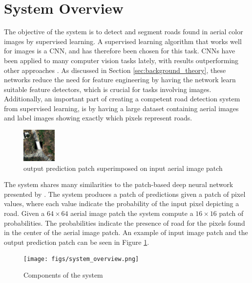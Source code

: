 \section{System Overview}
\label{sec:systemOverview}



The objective of the system is to detect and segment roads found in aerial color images by supervised learning. A supervised learning algorithm that works well for images is a \ac{CNN}, and has therefore been chosen for this task. \ac{CNN}s have been applied to many computer vision tasks lately, with results outperforming other approaches \citep{Krizhevsky_imagenet}. As discussed in Section \ref{sec:background_theory}, these networks reduce the need for feature engineering by having the network learn suitable feature detectors, which is crucial  for tasks involving images. Additionally, an important part of creating a competent road detection system from supervised learning, is by having a large dataset containing aerial images and label images showing exactly which pixels represent roads.\\

\begin{figure}[t]
\begin{center}
\includegraphics[width=0.15\columnwidth]{figs/labeloverlay.png}
\caption[Patches]{output prediction patch superimposed on input aerial image patch}
\label{fig:system_data_patch}
\end{center}
\end{figure}

The system shares many similarities to the patch-based deep neural network presented by \cite{Mnih_aerial_images_noisy}. The system produces a patch of predictions given a patch of pixel values, where each value indicate the probability of the input pixel depicting a road. Given a $64 \times 64$ aerial image patch the system compute a $16 \times 16$ patch of probabilities. The probabilities indicate the presence of road for the pixels found in the center of the aerial image patch. An example of input image patch and the output prediction patch can be seen in Figure \ref{fig:system_data_patch}.  \\

\begin{figure}[t]
\begin{center}
\texttt{[image: figs/system\_overview.png]}
\caption[Components of the system]{Components of the system}
\label{fig:system_components}
\end{center}
\end{figure}


